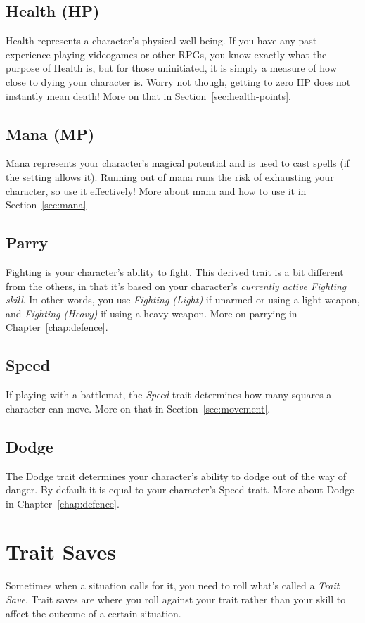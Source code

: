 \subsection{Health (HP)}
Health represents a character's physical well-being.
If you have any past experience playing videogames or other RPGs, you know exactly what the purpose of Health is, but for those uninitiated, it is simply a measure of how close to dying your character is.
Worry not though, getting to zero HP does not instantly mean death!
More on that in Section~\ref{sec:health-points}.

\subsection{Mana (MP)}
Mana represents your character's magical potential and is used to cast spells (if the setting allows it).
Running out of mana runs the risk of exhausting your character, so use it effectively!
More about mana and how to use it in Section~\ref{sec:mana}

\subsection{Parry}
Fighting is your character's ability to fight.
This derived trait is a bit different from the others, in that it's based on your character's \textit{currently active Fighting skill}.
In other words, you use \textit{Fighting (Light)} if unarmed or using a light weapon, and \textit{Fighting (Heavy)} if using a heavy weapon.
More on parrying in Chapter~\ref{chap:defence}.

\subsection{Speed}
If playing with a battlemat, the \textit{Speed} trait determines how many squares a character can move.
More on that in Section~\ref{sec:movement}.

\subsection{Dodge}
The Dodge trait determines your character's ability to dodge out of the way of danger. 
By default it is equal to your character's Speed trait.
More about Dodge in Chapter~\ref{chap:defence}.


\section{Trait Saves}
Sometimes when a situation calls for it, you need to roll what's called a \textit{Trait Save}.
Trait saves are where you roll against your trait rather than your skill to affect the outcome of a certain situation.

